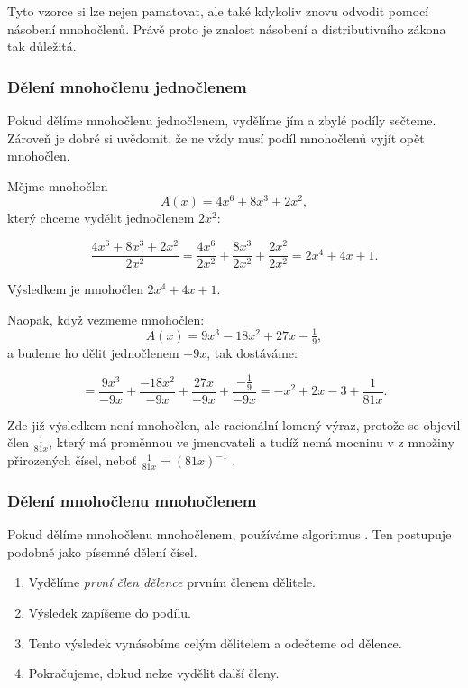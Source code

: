 \documentclass[12pt,a4paper]{article}
\begin{document}
Tyto vzorce si lze nejen pamatovat, ale také kdykoliv znovu odvodit pomocí násobení mnohočlenů.  
Právě proto je znalost násobení a distributivního zákona tak důležitá.


\subsubsection*{Dělení mnohočlenu jednočlenem}

Pokud dělíme mnohočlenu jednočlenem, vydělíme jím  a zbylé podíly sečteme.
Zároveň je dobré si uvědomit, že ne vždy musí podíl mnohočlenů vyjít opět mnohočlen.
\newpage
\begin{examplebox}
Mějme mnohočlen
\[
A(x) = 4x^6 + 8x^3 + 2x^2,
\]
který chceme vydělit jednočlenem $2x^2$:  

\[
\frac{4x^6 + 8x^3 + 2x^2}{2x^2}
= \frac{4x^6}{2x^2} + \frac{8x^3}{2x^2} + \frac{2x^2}{2x^2}
= 2x^4 + 4x + 1.
\]

Výsledkem je mnohočlen $2x^4 + 4x + 1$.

\medskip
Naopak, když vezmeme mnohočlen:
\[
A(x) = 9x^3 - 18x^2 + 27x - \tfrac{1}{9},
\]
a budeme ho dělit jednočlenem $-9x$, tak dostáváme:

\[
= \frac{9x^3}{-9x} + \frac{-18x^2}{-9x} + \frac{27x}{-9x} + \frac{-\tfrac{1}{9}}{-9x}
= -x^2 + 2x - 3 + \frac{1}{81x}.
\]

Zde již výsledkem není mnohočlen, ale racionální lomený výraz,  
protože se objevil člen $\frac{1}{81x}$, který má proměnnou ve jmenovateli a tudíž nemá mocninu v z množiny přirozených čísel, neboť $\frac{1}{81x} = (81x)^{-1}$ . 
\end{examplebox}



\subsubsection*{Dělení mnohočlenu mnohočlenem}

Pokud dělíme mnohočlenu mnohočlenem, používáme algoritmus .  
Ten postupuje podobně jako písemné dělení čísel.

\begin{enumerate}[label=\arabic*.]
    \item Vydělíme \emph{první člen dělence} prvním členem dělitele.  
    \item Výsledek zapíšeme do podílu.  
    \item Tento výsledek vynásobíme celým dělitelem a odečteme od dělence.  
    \item Pokračujeme, dokud nelze vydělit další členy.  
\end{enumerate}
\end{document}
